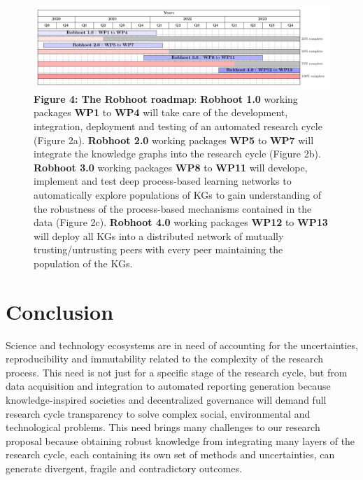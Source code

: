 \documentclass[10pt, a4paper, twocolumn]{article} %
\begin{document}
{\begin{figure}[ht]
  \centering
  \includegraphics[width=1\textwidth]{GanttChartWhitePaper.pdf}
  {\small {\bf Figure 4: The Robhoot roadmap}: {\bf Robhoot 1.0}
    working packages {\bf WP1} to {\bf WP4} will take care of the
    development, integration, deployment and testing of an automated
    research cycle (Figure 2a). {\bf Robhoot 2.0} working packages
    {\bf WP5} to {\bf WP7} will integrate the knowledge graphs into
    the research cycle (Figure 2b). {\bf Robhoot 3.0} working packages
    {\bf WP8} to {\bf WP11} will develope, implement and test deep
    process-based learning networks to automatically explore
    populations of KGs to gain understanding of the robustness of the
    process-based mechanisms contained in the data (Figure 2c). {\bf
      Robhoot 4.0} working packages {\bf WP12} to {\bf WP13} will deploy
    all KGs into a distributed network of mutually trusting/untrusting
    peers with every peer maintaining the population of the KGs.}
\end{figure}


\section{Conclusion}
Science and technology ecosystems are in need of accounting for the
uncertainties, reproducibility and immutability related to the
complexity of the research process. This need is not just for a
specific stage of the research cycle, but from data acquisition and
integration to automated reporting generation because
knowledge-inspired societies and decentralized governance will demand
full research cycle transparency to solve complex social,
environmental and technological problems. This need brings many
challenges to our research proposal because obtaining robust knowledge
from integrating many layers of the research cycle, each containing
its own set of methods and uncertainties, can generate divergent,
fragile and contradictory outcomes.

}
\end{document}
